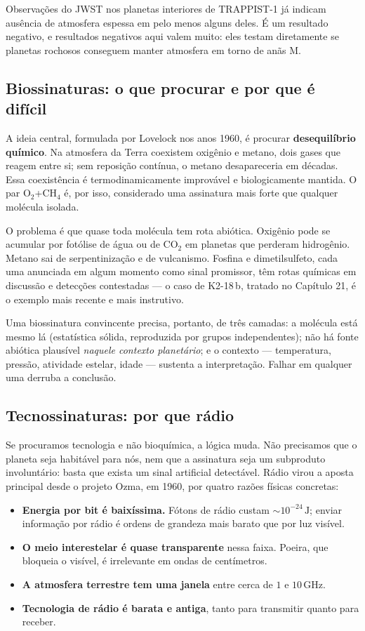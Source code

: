 \documentclass[11pt,a4paper]{article}
\begin{document}
Observações do JWST nos planetas interiores de TRAPPIST-1 já indicam ausência de atmosfera espessa em pelo menos alguns deles. É um resultado negativo, e resultados negativos aqui valem muito: eles testam diretamente se planetas rochosos conseguem manter atmosfera em torno de anãs M.

\subsection*{Biossinaturas: o que procurar e por que é difícil}

A ideia central, formulada por Lovelock nos anos 1960, é procurar \textbf{desequilíbrio químico}. Na atmosfera da Terra coexistem oxigênio e metano, dois gases que reagem entre si; sem reposição contínua, o metano desapareceria em décadas. Essa coexistência é termodinamicamente improvável e biologicamente mantida. O par O$_2$+CH$_4$ é, por isso, considerado uma assinatura mais forte que qualquer molécula isolada.

O problema é que quase toda molécula tem rota abiótica. Oxigênio pode se acumular por fotólise de água ou de CO$_2$ em planetas que perderam hidrogênio. Metano sai de serpentinização e de vulcanismo. Fosfina e dimetilsulfeto, cada uma anunciada em algum momento como sinal promissor, têm rotas químicas em discussão e detecções contestadas --- o caso de K2-18\,b, tratado no Capítulo 21, é o exemplo mais recente e mais instrutivo.

Uma biossinatura convincente precisa, portanto, de três camadas: a molécula está mesmo lá (estatística sólida, reproduzida por grupos independentes); não há fonte abiótica plausível \emph{naquele contexto planetário}; e o contexto --- temperatura, pressão, atividade estelar, idade --- sustenta a interpretação. Falhar em qualquer uma derruba a conclusão.

\subsection*{Tecnossinaturas: por que rádio}

Se procuramos tecnologia e não bioquímica, a lógica muda. Não precisamos que o planeta seja habitável para nós, nem que a assinatura seja um subproduto involuntário: basta que exista um sinal artificial detectável. Rádio virou a aposta principal desde o projeto Ozma, em 1960, por quatro razões físicas concretas:

\begin{itemize}
\item \textbf{Energia por bit é baixíssima.} Fótons de rádio custam $\sim10^{-24}\,\mathrm{J}$; enviar informação por rádio é ordens de grandeza mais barato que por luz visível.
\item \textbf{O meio interestelar é quase transparente} nessa faixa. Poeira, que bloqueia o visível, é irrelevante em ondas de centímetros.
\item \textbf{A atmosfera terrestre tem uma janela} entre cerca de $1$ e $10\,\mathrm{GHz}$.
\item \textbf{Tecnologia de rádio é barata e antiga}, tanto para transmitir quanto para receber.
\end{itemize}
\end{document}
